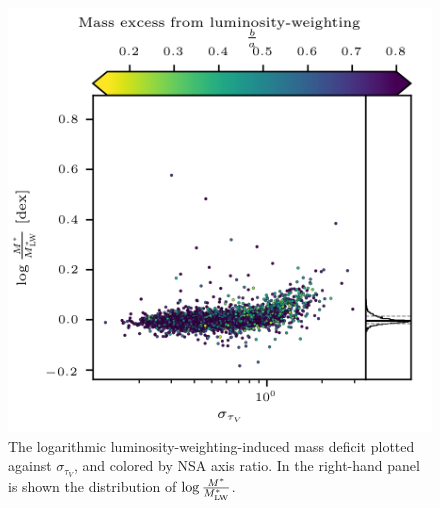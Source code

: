 \begin{figure}
    \centering
    \includegraphics[width=\columnwidth]{stdtauV_dMglobloc_ba}
    \caption[The relationship between mass deficit and unequal dust attenuation across the IFU]{\fixspacing The logarithmic luminosity-weighting-induced mass deficit plotted against $\sigma_{\tau_V}$, and colored by NSA axis ratio. In the right-hand panel is shown the distribution of $\log \frac{M^*}{M^*_{\rm LW}}$.}
    \label{fig:meantauV_dMglobloc_ba}
\end{figure}

